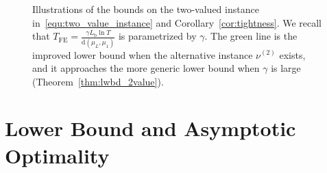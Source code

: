 \documentclass[twoside,11pt]{article}
\newcommand{\rmb}{\mathrm{b}}
\newcommand{\rmd}{\mathrm{d}}
\newcommand{\Tfe}{T_{\mathrm{FE}}}
\begin{document}
\begin{figure}[t]
\begin{center}
        \caption{Illustrations of the bounds on the two-valued instance in~\eqref{equ:two_value_instance} and Corollary~\ref{cor:tightness}. We recall that $\Tfe = \frac{\gamma L_{\rmb}\ln T}{\rmd(\mu_L,\mu_1)}$ is parametrized by $\gamma$. The green line is the improved lower bound when the alternative instance $\nu^{(2)}$ exists, and it approaches the more generic lower bound when $\gamma$ is large (Theorem~\ref{thm:lwbd_2value}).
        }
        \label{fig:tight_bounds}
    \end{center}
\end{figure}

\section{Lower Bound and Asymptotic Optimality}\label{sec:lwbd_tightness}
\end{document}
